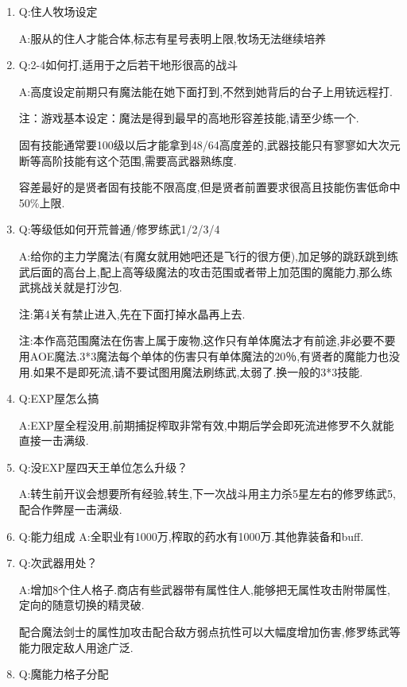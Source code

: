 \begin{enumerate}

	\item
	Q:住人牧场设定

	A:服从的住人才能合体,标志有星号表明上限,牧场无法继续培养

	\item
	Q:2-4如何打,适用于之后若干地形很高的战斗

	A:高度设定前期只有魔法能在她下面打到,不然到她背后的台子上用铳远程打.

	注：游戏基本设定：魔法是得到最早的高地形容差技能,请至少练一个.

	固有技能通常要100级以后才能拿到48/64高度差的,武器技能只有寥寥如大次元断等高阶技能有这个范围,需要高武器熟练度.

	容差最好的是贤者固有技能不限高度,但是贤者前置要求很高且技能伤害低命中50\%上限.

	\item
	Q:等级低如何开荒普通/修罗练武1/2/3/4

	A:给你的主力学魔法(有魔女就用她吧还是飞行的很方便),加足够的跳跃跳到练武后面的高台上,配上高等级魔法的攻击范围或者带上加范围的魔能力,那么练武挑战关就是打沙包.

	注:第4关有禁止进入,先在下面打掉水晶再上去.

	注:本作高范围魔法在伤害上属于废物,这作只有单体魔法才有前途,非必要不要用AOE魔法.3*3魔法每个单体的伤害只有单体魔法的20％,有贤者的魔能力也没用.如果不是即死流,请不要试图用魔法刷练武,太弱了.换一般的3*3技能.

	\item
	Q:EXP屋怎么搞

	A:EXP屋全程没用,前期捕捉榨取非常有效,中期后学会即死流进修罗不久就能直接一击满级.

	\item
	Q:没EXP屋四天王单位怎么升级？

	A:转生前开议会想要所有经验,转生,下一次战斗用主力杀5星左右的修罗练武5,配合作弊屋一击满级.

	\item
	Q:能力组成
	A:全职业有1000万,榨取的药水有1000万.其他靠装备和buff.

	\item
	Q:次武器用处？

	A:增加8个住人格子.商店有些武器带有属性住人,能够把无属性攻击附带属性,定向的随意切换的精灵破.

	配合魔法剑士的属性加攻击配合敌方弱点抗性可以大幅度增加伤害,修罗练武等能力限定敌人用途广泛.

	\item
	Q:魔能力格子分配


\end{enumerate}
